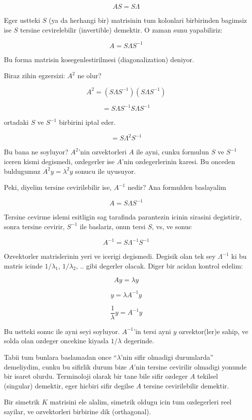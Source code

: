 \documentclass[12pt,fleqn]{article}\usepackage{../common}
\begin{document}
\[ AS = S\Lambda \]

Eger ustteki $S$ (ya da herhangi bir) matrisinin tum kolonlari birbirinden
bagimsiz ise $S$ tersine cevirelebilir (invertible) demektir. O zaman sunu
yapabiliriz:

\[ A = S \Lambda S^{-1} \]

Bu forma matrisin kosegenlestirilmesi (diagonalization) deniyor. 

Biraz zihin egzersizi: $A^2$ ne olur? 

\[ A^2 = (S \Lambda S^{-1})(S \Lambda S^{-1}) \]

\[ = S \Lambda S^{-1}S \Lambda S^{-1} \]

ortadaki $S$ ve $S^{-1}$ birbirini iptal eder. 

\[ = S \Lambda^2 S^{-1} \]

Bu bana ne soyluyor? $A^2$'nin ozvektorleri $A$ ile ayni, cunku formulun
$S$ ve $S^{-1}$ iceren kismi degismedi, ozdegerler ise $A$'nin
ozdegerlerinin karesi. Bu onceden buldugumuz $A^2y = \lambda^2y$ sonucu ile uyusuyor.

Peki, diyelim tersine cevirilebilir ise, $A^{-1}$ nedir? Ana formulden baslayalim

\[ A = S \Lambda S^{-1} \]

Tersine cevirme islemi esitligin sag tarafinda parantezin icinin sirasini
degistirir, sonra tersine cevirir, $S^{-1}$ ile baslariz, onun tersi $S$,
vs, ve sonuc

\[ A^{-1} = S \Lambda^{-1}S^{-1} \]

Ozvektorler matrislerinin yeri ve icerigi degismedi. Degisik olan tek sey
$\Lambda^{-1}$ ki bu matris icinde $1/\lambda_1$, $1/\lambda_2$, .. gibi
degerler olacak. Diger bir acidan kontrol edelim:

\[ Ay = \lambda y \]

\[ y = \lambda A^{-1} y \]

\[ \frac{1}{\lambda}y =  A^{-1} y \]

Bu ustteki sonuc ile ayni seyi soyluyor. $A^{-1}$'in tersi ayni $y$
ozvektor(ler)e sahip, ve solda olan ozdeger oncekine kiyasla $1/\lambda$
degerinde. 

Tabii tum bunlara baslamadan once ``$\lambda$'nin sifir olmadigi
durumlarda'' demeliydim, cunku bu sifirlik durum bize $A$'nin tersine
cevirilir olmadigi yonunde bir isaret olurdu. Terminoloji olarak bir tane
bile sifir ozdeger $A$ tekilsel (singular) demektir, eger hicbiri sifir
degilse $A$ tersine cevirilebilir demektir. 

Bir simetrik $K$ matrisini ele alalim, simetrik oldugu icin tum ozdegerleri
reel sayilar, ve ozvektorleri birbirine dik (orthagonal). 
\end{document}
